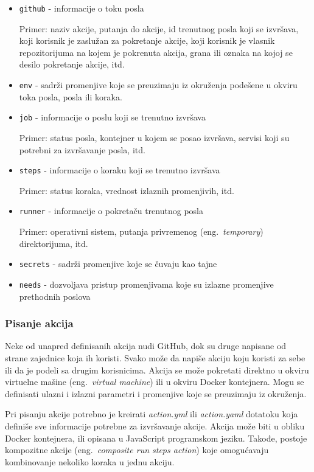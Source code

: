 \documentclass[12pt]{report}
\begin{document}
\begin{itemize}
    \item\texttt{github} - informacije o toku posla

    Primer: naziv akcije, putanja do akcije, id trenutnog posla koji se izvršava, koji korisnik je zaslužan za pokretanje akcije, koji korisnik je vlasnik repozitorijuma na kojem je pokrenuta akcija, grana ili oznaka na kojoj se desilo pokretanje akcije, itd.
    \item\texttt{env} - sadrži promenjive koje se preuzimaju iz okruženja podešene u okviru toka posla, posla ili koraka.
    \item\texttt{job} - informacije o poslu koji se trenutno izvršava

    Primer: status posla, kontejner u kojem se posao izvršava, servisi koji su potrebni za izvršavanje posla, itd.
    \item\texttt{steps} - informacije o koraku koji se trenutno izvršava

    Primer: status koraka, vrednost izlaznih promenjivih, itd.
    \item\texttt{runner} - informacije o pokretaču trenutnog posla

    Primer: operativni sistem, putanja privremenog (eng.\ \textit{temporary}) direktorijuma, itd.
    \item\texttt{secrets} - sadrži promenjive koje se čuvaju kao tajne
    \item\texttt{needs} - dozvoljava pristup promenjivama koje su izlazne promenjive prethodnih poslova
\end{itemize}

\subsubsection{Pisanje akcija}
Neke od unapred definisanih akcija nudi GitHub, dok su druge napisane od strane zajednice koja ih koristi. Svako može da napiše akciju koju koristi za sebe ili da je podeli sa drugim korisnicima. Akcija se može pokretati direktno u okviru virtuelne mašine (eng.\ \textit{virtual machine}) ili u okviru Docker kontejnera. Mogu se definisati ulazni i izlazni parametri i promenjive koje se preuzimaju iz okruženja.

Pri pisanju akcije potrebno je kreirati \textit{action.yml} ili \textit{action.yaml} dotatoku koja definiše sve informacije potrebne za izvršavanje akcije. Akcija može biti u obliku Docker kontejnera, ili opisana u JavaScript programskom jeziku. Takođe, postoje kompozitne akcije (eng.\ \textit{composite run steps action}) koje omogućavaju kombinovanje nekoliko koraka u jednu akciju.
\end{document}
